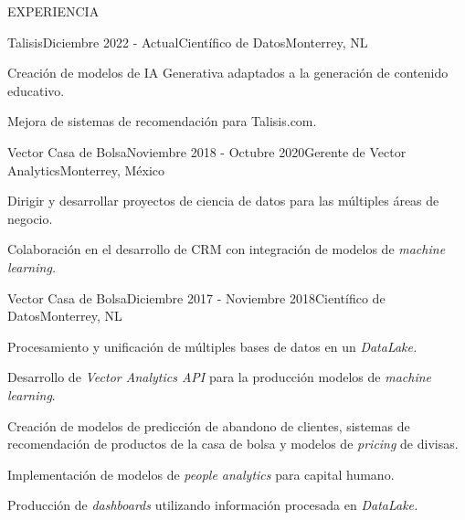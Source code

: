 \documentclass{resume} %
\begin{document}


\begin{rSection}{EXPERIENCIA}

\begin{rSubsection}{Talisis}{Diciembre 2022 - Actual}{Científico de Datos}{Monterrey, NL}
    \item Creación de modelos de IA Generativa adaptados a la generación de contenido educativo.
    \item Mejora de sistemas de recomendación para Talisis.com.
\end{rSubsection}

\begin{rSubsection}{Vector Casa de Bolsa}{Noviembre 2018 - Octubre 2020}{Gerente de Vector Analytics}{Monterrey, México}
\item Dirigir y desarrollar proyectos de ciencia de datos para las múltiples áreas de negocio.
\item Colaboración en el desarrollo de CRM con integración de modelos de \textit{machine learning.}
\end{rSubsection}

\begin{rSubsection}{Vector Casa de Bolsa}{Diciembre 2017 - Noviembre 2018}{Científico de Datos}{Monterrey, NL}

\item Procesamiento y unificación de múltiples bases de datos en un \textit{DataLake.}
\item Desarrollo de \textit{Vector Analytics API} para la producción modelos de \textit{machine learning}.
\item Creación de modelos de predicción de abandono de clientes, sistemas de recomendación de productos de la casa de bolsa y modelos de \textit{pricing} de divisas.
\item Implementación de modelos de \textit{people analytics} para capital humano.
\item Producción de \textit{dashboards} utilizando información procesada en \textit{DataLake.}
\end{rSubsection}


\end{rSection}
\end{document}
